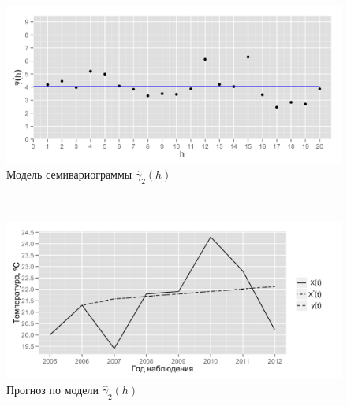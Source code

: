 \documentclass{beamer}
\begin{document}
\begin{frame}
\begin{multicols}{2}
    \columnbreak
    \begin{figure}[H]
      \begin{center}
        \begin{minipage}[H]{0.95\linewidth}
          \begin{center}
            \includegraphics[width=1\linewidth]{../../figures/variogram/lin-fit-modeled.png} \\ Модель семивариограммы $\widehat{\gamma}_2(h)$
          \end{center}
        \end{minipage}
        \\
        \begin{minipage}[H]{0.95\linewidth}
          \begin{center}
            \includegraphics[width=1\linewidth]{../../figures/variogram/lin-fit-cross-prediction.png} \\ Прогноз по модели $\widehat{\gamma}_2(h)$
          \end{center}
        \end{minipage}
      \end{center}
    \end{figure}
  \end{multicols}
\end{frame}
\end{document}
